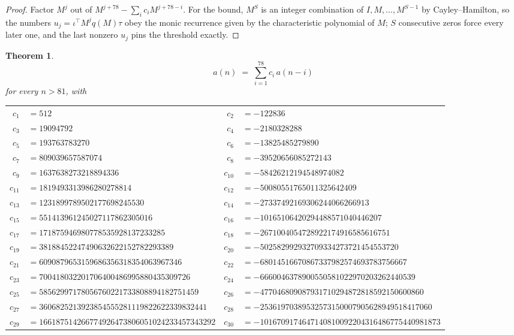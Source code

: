 \documentclass[11pt,a4paper]{article}
\theoremstyle{plain}
\newtheorem{theorem}{Theorem}
\theoremstyle{definition}
\begin{document}
\begin{proof}
Factor $M^{j}$ out of $M^{j+78}-\sum_ic_iM^{j+78-i}$. For the bound, $M^{S}$
is an integer combination of $I,M,\dots,M^{S-1}$ by Cayley--Hamilton, so the numbers
$u_j=\iota^{\!\top}M^{j}q(M)\tau$ obey the monic recurrence given by the characteristic
polynomial of $M$; $S$ consecutive zeros force every later one, and the last nonzero $u_j$
pins the threshold exactly.
\end{proof}

\begin{theorem}
\[
a(n)\;=\;\sum_{i=1}^{78}c_i\,a(n-i)
\]
for every $n>81$, with
\begin{center}\footnotesize
\begin{tabular}{r@{\,}l@{\qquad}r@{\,}l}
$c_{1}$ & $=512$ & $c_{2}$ & $=-122836$ \\
$c_{3}$ & $=19094792$ & $c_{4}$ & $=-2180328288$ \\
$c_{5}$ & $=193763783270$ & $c_{6}$ & $=-13825485279890$ \\
$c_{7}$ & $=809039657587074$ & $c_{8}$ & $=-39520656085272143$ \\
$c_{9}$ & $=1637638273218894336$ & $c_{10}$ & $=-58426212194548974082$ \\
$c_{11}$ & $=1819493313986280278814$ & $c_{12}$ & $=-50080551765011325642409$ \\
$c_{13}$ & $=1231899789502177698245530$ & $c_{14}$ & $=-27337492169306244066266913$ \\
$c_{15}$ & $=551413961245027117862305016$ & $c_{16}$ & $=-10165106420294488571040446207$ \\
$c_{17}$ & $=171875946980778535928137233285$ & $c_{18}$ & $=-2671004054728922174916585616751$ \\
$c_{19}$ & $=38188452247490632622152782293389$ & $c_{20}$ & $=-502582992932709334273721454553720$ \\
$c_{21}$ & $=6090879653159686356318354063967346$ & $c_{22}$ & $=-68014516670867337982574693783756667$ \\
$c_{23}$ & $=700418032201706400486995880435309726$ & $c_{24}$ & $=-6660046378900550581022970203262440539$ \\
$c_{25}$ & $=58562997178056760221733808894182751459$ & $c_{26}$ & $=-477046809087931710294872818592150600860$ \\
$c_{27}$ & $=3606825213923854555281119822622339832441$ & $c_{28}$ & $=-25361970389532573150007905628949518417060$ \\
$c_{29}$ & $=166187514266774926473806051024233457343292$ & $c_{30}$ & $=-1016709174647140810092204316486775440981873$ \\

\end{tabular}
\end{center}
\end{theorem}
\end{document}
